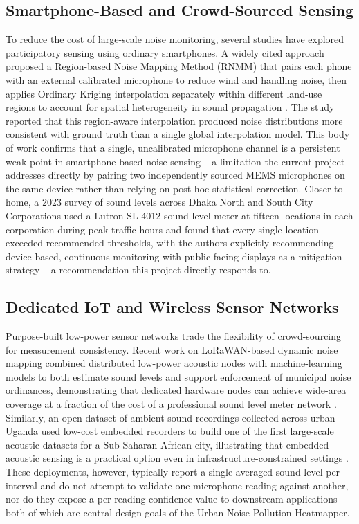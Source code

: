 \documentclass[conference]{IEEEtran}
\begin{document}
\subsection{Smartphone-Based and Crowd-Sourced Sensing}
To reduce the cost of large-scale noise monitoring, several studies have explored participatory sensing using ordinary smartphones. A widely cited approach proposed a Region-based Noise Mapping Method (RNMM) that pairs each phone with an external calibrated microphone to reduce wind and handling noise, then applies Ordinary Kriging interpolation separately within different land-use regions to account for spatial heterogeneity in sound propagation \cite{b5}. The study reported that this region-aware interpolation produced noise distributions more consistent with ground truth than a single global interpolation model. This body of work confirms that a single, uncalibrated microphone channel is a persistent weak point in smartphone-based noise sensing -- a limitation the current project addresses directly by pairing two independently sourced MEMS microphones on the same device rather than relying on post-hoc statistical correction. Closer to home, a 2023 survey of sound levels across Dhaka North and South City Corporations used a Lutron SL-4012 sound level meter at fifteen locations in each corporation during peak traffic hours and found that every single location exceeded recommended thresholds, with the authors explicitly recommending device-based, continuous monitoring with public-facing displays as a mitigation strategy \cite{b4} -- a recommendation this project directly responds to.

\subsection{Dedicated IoT and Wireless Sensor Networks}
Purpose-built low-power sensor networks trade the flexibility of crowd-sourcing for measurement consistency. Recent work on LoRaWAN-based dynamic noise mapping combined distributed low-power acoustic nodes with machine-learning models to both estimate sound levels and support enforcement of municipal noise ordinances, demonstrating that dedicated hardware nodes can achieve wide-area coverage at a fraction of the cost of a professional sound level meter network \cite{b8}. Similarly, an open dataset of ambient sound recordings collected across urban Uganda used low-cost embedded recorders to build one of the first large-scale acoustic datasets for a Sub-Saharan African city, illustrating that embedded acoustic sensing is a practical option even in infrastructure-constrained settings \cite{b9}. These deployments, however, typically report a single averaged sound level per interval and do not attempt to validate one microphone reading against another, nor do they expose a per-reading confidence value to downstream applications -- both of which are central design goals of the Urban Noise Pollution Heatmapper.
\end{document}
